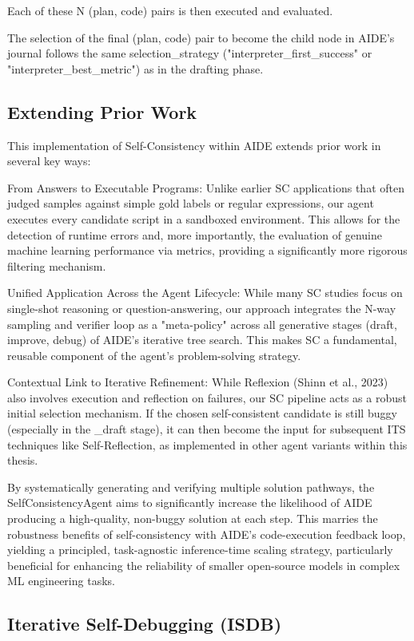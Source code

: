 Each of these N (plan, code) pairs is then executed and evaluated.

The selection of the final (plan, code) pair to become the child node in AIDE's journal follows the same selection_strategy ("interpreter\_first\_success" or "interpreter\_best\_metric") as in the drafting phase.

\subsection{Extending Prior Work}
This implementation of Self-Consistency within AIDE extends prior work in several key ways:

From Answers to Executable Programs: Unlike earlier SC applications that often judged samples against simple gold labels or regular expressions, our agent executes every candidate script in a sandboxed environment. This allows for the detection of runtime errors and, more importantly, the evaluation of genuine machine learning performance via metrics, providing a significantly more rigorous filtering mechanism.

Unified Application Across the Agent Lifecycle: While many SC studies focus on single-shot reasoning or question-answering, our approach integrates the N-way sampling and verifier loop as a "meta-policy" across all generative stages (draft, improve, debug) of AIDE’s iterative tree search. This makes SC a fundamental, reusable component of the agent's problem-solving strategy.

Contextual Link to Iterative Refinement: While Reflexion (Shinn et al., 2023) also involves execution and reflection on failures, our SC pipeline acts as a robust initial selection mechanism. If the chosen self-consistent candidate is still buggy (especially in the _draft stage), it can then become the input for subsequent ITS techniques like Self-Reflection, as implemented in other agent variants within this thesis.

By systematically generating and verifying multiple solution pathways, the SelfConsistencyAgent aims to significantly increase the likelihood of AIDE producing a high-quality, non-buggy solution at each step. This marries the robustness benefits of self-consistency with AIDE’s code-execution feedback loop, yielding a principled, task-agnostic inference-time scaling strategy, particularly beneficial for enhancing the reliability of smaller open-source models in complex ML engineering tasks.


\subsection{Iterative Self-Debugging (ISDB)}

